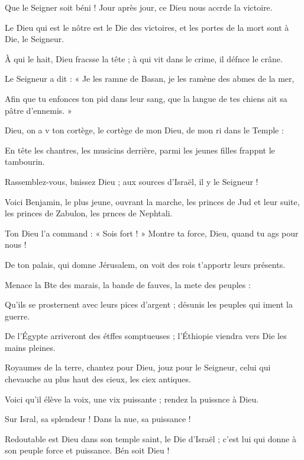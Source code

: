 \item Que le Seigner soit béni ! Jour après jour, ce Dieu nous accrde la victoire.
\item Le Dieu qui est le nôtre est le Die des victoires, et les portes de la mort sont à Die, le Seigneur.
\item À qui le hait, Dieu fracsse la tête ; à qui vit dans le crime, il défnce le crâne.
\item Le Seigneur a dit : « Je les ramne de Basan, je les ramène des abmes de la mer,
\item Afin que tu enfonces ton pid dans leur sang, que la langue de tes chiens ait sa pâtre d’ennemis. »
\item Dieu, on a v ton cortège, le cortège de mon Dieu, de mon ri dans le Temple :
\item En tête les chantres, les musicins derrière, parmi les jeunes filles frappnt le tambourin.
\item Rassemblez-vous, bnissez Dieu ; aux sources d’Israël, il y  le Seigneur !
\item Voici Benjamin, le plus jeune, ouvrant la marche, les princes de Jud et leur suite, les princes de Zabulon, les prnces de Nephtali.
\item Ton Dieu l’a command : « Sois fort ! » Montre ta force, Dieu, quand tu ags pour nous !
\item De ton palais, qui domne Jérusalem, on voit des rois t’apportr leurs présents.
\item Menace la Bte des marais, la bande de fauves, la mete des peuples : 
\item Qu’ils se prosternent avec leurs pices d’argent ; désunis les peuples qui iment la guerre.
\item De l’Égypte arriveront des étffes somptueuses ; l’Éthiopie viendra vers Die les mains pleines.
\item Royaumes de la terre, chantez pour Dieu, jouz pour le Seigneur, celui qui chevauche au plus haut des cieux, les ciex antiques. 
\item Voici qu’il élève la voix, une vix puissante ; rendez la puissnce à Dieu.
\item Sur Isral, sa splendeur ! Dans la nue, sa puissance !
\item Redoutable est Dieu dans son temple saint, le Die d’Israël ; c’est lui qui donne à son peuple force et puissance. Bén soit Dieu !